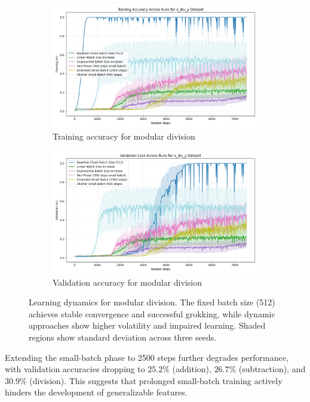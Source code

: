 \documentclass{article} %
\begin{document}
\begin{figure}[h]
    \centering
    \begin{subfigure}{0.49\textwidth}
        \includegraphics[width=\textwidth]{train_acc_x_div_y.png}
        \caption{Training accuracy for modular division}
        \label{fig:div-train-acc}
    \end{subfigure}
    \hfill
    \begin{subfigure}{0.49\textwidth}
        \includegraphics[width=\textwidth]{val_acc_x_div_y.png}
        \caption{Validation accuracy for modular division}
        \label{fig:div-val-acc}
    \end{subfigure}
    \caption{Learning dynamics for modular division. The fixed batch size (512) achieves stable convergence and successful grokking, while dynamic approaches show higher volatility and impaired learning. Shaded regions show standard deviation across three seeds.}
    \label{fig:division-dynamics}
\end{figure}

Extending the small-batch phase to 2500 steps further degrades performance, with validation accuracies dropping to $25.2\%$ (addition), $26.7\%$ (subtraction), and $30.9\%$ (division). This suggests that prolonged small-batch training actively hinders the development of generalizable features.
\end{document}
